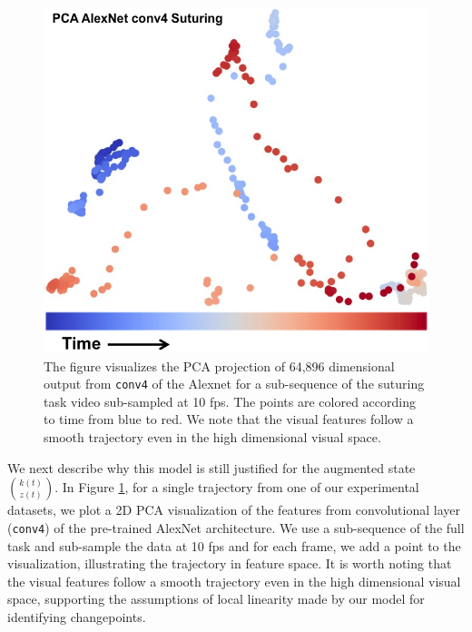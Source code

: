 \begin{figure}[t!]
\centering
\includegraphics[width=0.7\linewidth]{figures/pca_conv4.png}
\caption{The figure visualizes the PCA projection of 64,896 dimensional output from \texttt{conv4} of the Alexnet for a sub-sequence of the suturing task video sub-sampled at 10 fps. The points are colored according to time from blue to red. We note that the visual features follow a smooth trajectory even in the high dimensional visual space.   \label{fig:imgtraj}}
\vspace{-10pt}
\end{figure}

We next describe why this model is still justified for the augmented state $\binom{k(t)}{z(t)}$.
In Figure \ref{fig:imgtraj}, for a single trajectory from one of our experimental datasets, we plot a 2D PCA visualization of the features from convolutional layer (\texttt{conv4}) of the pre-trained AlexNet architecture. We use a sub-sequence of the full task and sub-sample the data at 10 fps and for each frame, we add a point to the visualization, illustrating the trajectory in feature space. It is worth noting that the visual features follow a smooth trajectory even in the high dimensional visual space, supporting the assumptions of local linearity made by our model for identifying changepoints.
